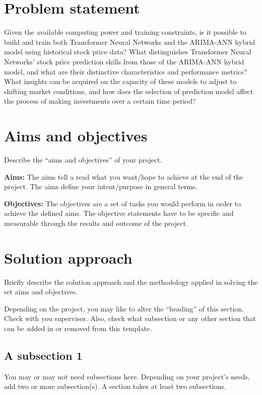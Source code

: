 \section{Problem statement}
\label{sec:intro_prob_art}
Given the available computing power and training constraints, is it possible to build and train both Transformer Neural Networks and the ARIMA-ANN hybrid model using historical stock price data? What distinguishes Transformer Neural Networks' stock price prediction skills from those of the ARIMA-ANN hybrid model, and what are their distinctive characteristics and performance metrics? What insights can be acquired on the capacity of these models to adjust to shifting market conditions, and how does the selection of prediction model affect the process of making investments over a certain time period?

\section{Aims and objectives}
\label{sec:intro_aims_obj}
Describe the ``aims and objectives'' of your project. 

\textbf{Aims:} The aims tell a read what you want/hope to achieve at the end of the project. The  aims define your intent/purpose in general terms.  

\textbf{Objectives:} The objectives are a set of tasks you would perform in order to achieve the defined aims. The objective statements have to be specific and measurable through the results and outcome of the project.



\section{Solution approach}
\label{sec:intro_sol} %
Briefly describe the solution approach and the methodology applied in solving the set aims and objectives.

Depending on the project, you may like to alter the ``heading'' of this section. Check with you supervisor. Also, check what subsection or any other section that can be added in or removed from this template.

\subsection{A subsection 1}
\label{sec:intro_some_sub1}
You may or may not need subsections here. Depending on your project's needs, add two or more subsection(s). A section takes at least two subsections. 

